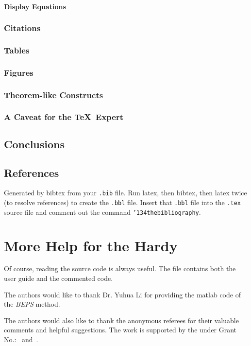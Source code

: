 \documentclass[sigconf]{acmart}
\begin{document}
\paragraph{Display Equations}
\subsubsection{Citations}
\subsubsection{Tables}
\subsubsection{Figures}
\subsubsection{Theorem-like Constructs}
\subsubsection*{A Caveat for the \TeX\ Expert}
\subsection{Conclusions}
\subsection{References}

Generated by bibtex from your \texttt{.bib} file.  Run latex, then
bibtex, then latex twice (to resolve references) to create the
\texttt{.bbl} file.  Insert that \texttt{.bbl} file into the
\texttt{.tex} source file and comment out the command
\texttt{{\char'134}thebibliography}.


\section{More Help for the Hardy}

Of course, reading the source code is always useful.  The file
 contains both the user guide and the commented code.

\begin{acks}

  The authors would like to thank Dr. Yuhua Li for providing the
  matlab code of the \textit{BEPS} method.

  The authors would also like to thank the anonymous referees for
  their valuable comments and helpful suggestions. The work is
  supported by the  under Grant
  No.:~
  and~.

\end{acks}


 
\end{document}

